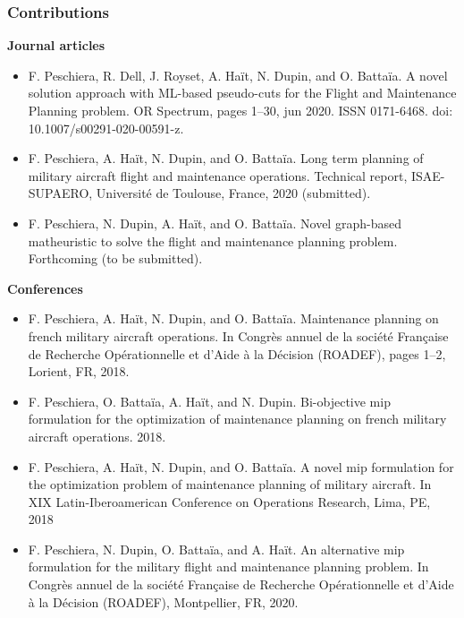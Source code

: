 \begin{frame}
\frametitle{\textbf{Contributions}}

\fontsize{6pt}{7.2}\selectfont
\begin{block}{\textbf{Journal articles}}

  \begin{itemize}
    \item F. Peschiera, R. Dell, J. Royset, A. Haït, N. Dupin, and O. Battaïa. A novel solution approach with ML-based pseudo-cuts for the Flight and Maintenance Planning problem. OR Spectrum, pages 1–30, jun 2020. ISSN 0171-6468. doi: 10.1007/s00291-020-00591-z.

    \item F. Peschiera, A. Haït, N. Dupin, and O. Battaïa. Long term planning of military aircraft flight and maintenance operations. Technical report, ISAE-SUPAERO, Université de Toulouse, France, 2020 (submitted).

    \item  F. Peschiera, N. Dupin, A. Haït, and O. Battaïa. Novel graph-based matheuristic to solve the flight and maintenance planning problem. Forthcoming (to be submitted).
  \end{itemize}

\end{block}

\begin{block}{\textbf{Conferences}}

  \begin{itemize}
    \item F. Peschiera, A. Haït, N. Dupin, and O. Battaïa. Maintenance planning on french military aircraft operations. In Congrès annuel de la société Française de Recherche Opérationnelle et d’Aide à la Décision (ROADEF), pages 1–2, Lorient, FR, 2018.

    \item F. Peschiera, O. Battaïa, A. Haït, and N. Dupin. Bi-objective mip formulation for the  optimization of maintenance planning on french military aircraft operations. 2018. 
    
    \item F. Peschiera, A. Haït, N. Dupin, and O. Battaïa. A novel mip formulation for the optimization problem of maintenance planning of military aircraft. In XIX Latin-Iberoamerican Conference on Operations Research, Lima, PE, 2018
    
    \item F. Peschiera, N. Dupin, O. Battaïa, and A. Haït. An alternative mip formulation for the military flight and maintenance planning problem. In Congrès annuel de la société Française de Recherche Opérationnelle et d’Aide à la Décision (ROADEF), Montpellier, FR, 2020.

  \end{itemize}
\end{block}

\end{frame}

